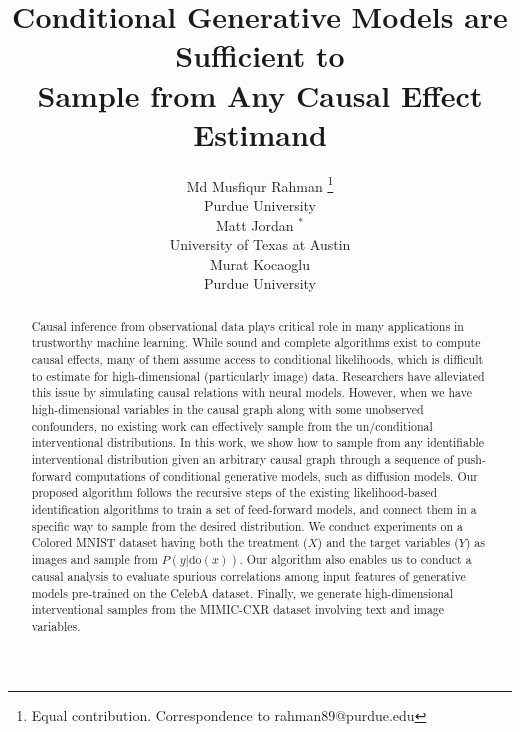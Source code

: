 \documentclass{article}
\title{Conditional Generative Models are Sufficient to \\Sample from Any Causal 
Effect Estimand}
\author{%
Md Musfiqur Rahman
\thanks{Equal contribution. Correspondence to rahman89@purdue.edu}
\\
Purdue University\\
\And
Matt Jordan $^{*}$\\
  University of Texas at Austin \\
    \And
  Murat Kocaoglu \\
  Purdue University \\
}
\newcommand{\Do}{\text{do}}
\theoremstyle{plain}
\theoremstyle{definition}
\theoremstyle{remark}
\begin{document}
\maketitle


	
\begin{abstract}
Causal inference from observational data plays critical role in many applications in trustworthy machine learning.
While sound and complete algorithms exist to compute causal effects, many of them assume access to conditional likelihoods,
 which is difficult to estimate for high-dimensional (particularly image) data. Researchers have alleviated this issue by simulating causal relations with neural models.
However, when we have high-dimensional variables in the causal graph along with some unobserved confounders, no existing work can effectively sample from the un/conditional interventional distributions. 
In this work, we show how to sample from any identifiable interventional distribution given an arbitrary causal graph through a sequence of push-forward computations of conditional generative models, such as diffusion models. Our proposed algorithm follows the recursive steps of the existing likelihood-based identification algorithms to train a set of feed-forward models, and connect them in a specific way to sample from the desired distribution. 
We conduct experiments on a Colored MNIST dataset having both the treatment ($X$) and the target variables ($Y$) as images and sample from $P(y|\Do(x))$. Our algorithm also enables us to conduct a causal analysis to evaluate spurious correlations among input features of generative models pre-trained on the CelebA dataset. Finally, we generate high-dimensional interventional samples from the MIMIC-CXR dataset involving text and image variables.
	\end{abstract}
  
\end{document}
